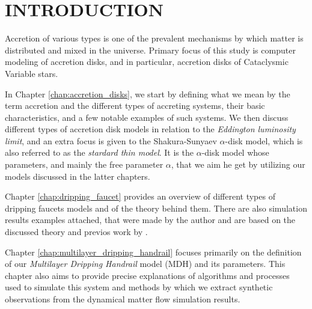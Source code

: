 \chapter{INTRODUCTION}
\thispagestyle{empty}


Accretion of various types is one of the prevalent mechanisms by which matter is distributed and mixed in the universe. Primary focus of this study is computer modeling of accretion disks, and in particular, accretion disks of Cataclysmic Variable stars.

In Chapter \ref{chap:accretion_disks}, we start by defining what we mean by the term accretion and the different types of accreting systems, their basic characteristics, and a few notable examples of such systems. We then discuss different types of accretion disk models in relation to the \emph{Eddington luminosity limit}, and an extra focus is given to the Shakura-Sunyaev $\alpha$-disk model, which is also referred to as the \emph{stardard thin model}. It is the $\alpha$-disk model whose parameters, and mainly the free parameter $\alpha$, that we aim he get by utilizing our models discussed in the latter chapters.

Chapter \ref{chap:dripping_faucet} provides an overview of different types of dripping faucets models and of the theory behind them. There are also simulation results examples attached, that were made by the author and are based on the discussed theory and previos work by \citep{kveton2014}. \citep{kveton2014} 

Chapter \ref{chap:multilayer_dripping_handrail} focuses primarily on the definition of our \emph{Multilayer Dripping Handrail} model (MDH) and its parameters. This chapter also aims to provide precise explanations of algorithms and processes used to simulate this system and methods by which we extract synthetic observations from the dynamical matter flow simulation results.

